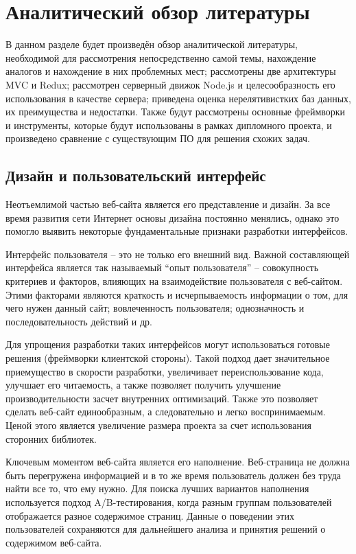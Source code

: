\section{Аналитический обзор литературы}
\label{sec:domain}

В данном разделе будет произведён обзор аналитической литературы, необходимой для рассмотрения непосредственно самой темы, нахождение аналогов и нахождение в них проблемных мест; рассмотрены две архитектуры MVC и Redux; рассмотрен серверный движок Node.js и целесообразность его использования в качестве сервера; приведена оценка нерелятивистких баз данных, их преимущества и недостатки.
Также будут рассмотрены основные фреймворки и инструменты, которые будут использованы в рамках дипломного проекта, и произведено сравнение с существующим ПО для решения схожих задач.

\subsection{Дизайн и пользовательский интерфейс}
\label{sub:domain:bayes_net}
Неотъемлимой частью веб-сайта является его представление и дизайн. За все время развития сети Интернет основы дизайна постоянно менялись, однако это помогло выявить некоторые фундаментальные признаки разработки интерфейсов.

Интерфейс пользователя – это не только его внешний вид. Важной составляющей интерфейса является так называемый “опыт пользователя” – совокупность критериев и факторов, влияющих на взаимодействие пользователя с веб-сайтом. Этими факторами являются краткость и исчерпываемость информации о том, для чего нужен данный сайт; вовлеченность пользователя; однозначность и последовательность действий и др.

Для упрощения разработки таких интерфейсов могут использоваться готовые решения (фреймворки клиентской стороны). Такой подход дает значительное приемущество в скорости разработки, увеличивает переиспользование кода, улучшает его читаемость, а также позволяет получить улучшение производительности засчет внутренних оптимизаций. Также это позволяет сделать веб-сайт единообразным, а следовательно и легко воспринимаемым. Ценой этого является увеличение размера проекта за счет использования сторонних библиотек.

Ключевым моментом веб-сайта является его наполнение. Веб-страница не должна быть перегружена информацией и в то же время пользователь должен без труда найти все то, что ему нужно. Для поиска лучших вариантов наполнения используется подход A/B-тестирования, когда разным группам пользователей отображается разное содержимое страниц. Данные о поведении этих пользователей сохраняются для дальнейшего анализа и принятия решений о содержимом веб-сайта.

